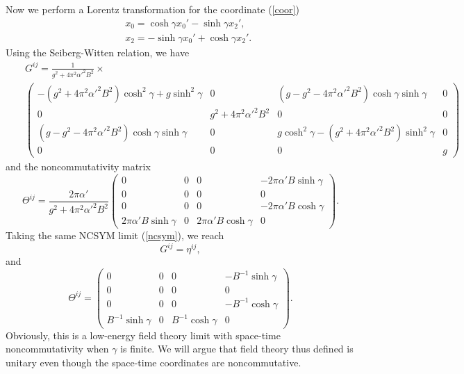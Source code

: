 \documentclass[a4paper,12pt]{article}
\begin{document}
Now we perform a Lorentz transformation for the coordinate (\ref{coor})
\begin{eqnarray}
&& x_0=\cosh \gamma x_0'-\sinh\gamma x_2', \nonumber\\
\label{lorentz}
&& x_2=-\sinh\gamma x_0'+\cosh\gamma x_2'.
\end{eqnarray}
Using the Seiberg-Witten relation, we have
\begin{eqnarray}
&& G^{ij} = \frac{1}{g^2 +4\pi^2 \alpha'^2 B^2} \times \nonumber \\
&& \left (
\begin{array}{cccc}
{\scriptstyle -(g^2+4\pi^2 \alpha'^2 B^2)\cosh^2\gamma +g \sinh^2\gamma}
& 0 & {\scriptstyle (g-g^2-4\pi^2 \alpha'^2 B^2) \cosh\gamma\sinh\gamma}
& 0 \\
0 & {\scriptstyle g^2 +4\pi^2 \alpha'^2 B^2} & 0 &0 \\
{\scriptstyle (g-g^2-4\pi^2 \alpha'^2 B^2) \cosh\gamma\sinh\gamma} & 0
& {\scriptstyle g\cosh^2\gamma -(g^2 +4\pi^2 \alpha'^2 B^2) \sinh^2\gamma}
 &0 \\
0 & 0& 0& g
\end{array}
\right )
\end{eqnarray}
and the noncommutativity matrix
\begin{equation}
\Theta^{ij} =\frac{2\pi\alpha'}{g^2 +4\pi^2 \alpha'^2 B^2}
\left (
\begin{array}{cccc}
0 & 0& 0& -2\pi \alpha' B \sinh\gamma \\
0& 0& 0& 0 \\
0& 0& 0& -2\pi\alpha' B \cosh\gamma\\
2\pi \alpha' B\sinh\gamma &0& 2\pi\alpha' B \cosh\gamma &0
\end{array}
\right).
\end{equation}
Taking the same NCSYM limit (\ref{ncsym}), we reach
\begin{equation}
G^{ij}=\eta^{ij},
\end{equation}
and
\begin{equation}
\label{ncm1}
\Theta^{ij}= \left (
\begin{array}{cccc}
0 & 0& 0& -B^{-1}\sinh\gamma \\
0 & 0& 0& 0 \\
0 & 0& 0& -B^{-1}\cosh\gamma \\
B^{-1}\sinh\gamma &0& B^{-1}\cosh\gamma &0
\end{array}
\right).
\end{equation}
Obviously, this is a low-energy field theory limit with space-time
noncommutativity when $\gamma$ is finite. We will argue that field theory thus
defined is unitary even though the space-time coordinates are noncommutative.
\end{document}
